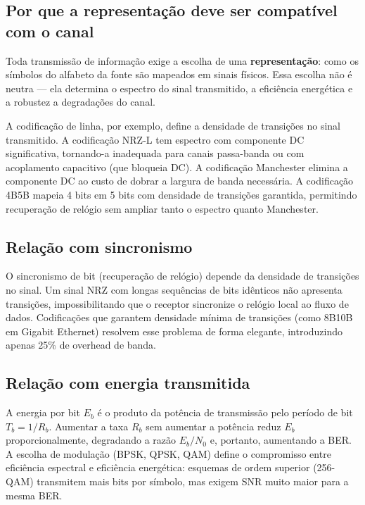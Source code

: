 \documentclass[conference]{IEEEtran}
\begin{document}
\subsection*{Por que a representação deve ser compatível com o canal}

Toda transmissão de informação exige a escolha de uma \textbf{representação}: como os
símbolos do alfabeto da fonte são mapeados em sinais físicos. Essa escolha não é neutra ---
ela determina o espectro do sinal transmitido, a eficiência energética e a robustez a
degradações do canal.

A codificação de linha, por exemplo, define a densidade de transições no sinal transmitido.
A codificação NRZ-L tem espectro com componente DC significativa, tornando-a inadequada
para canais passa-banda ou com acoplamento capacitivo (que bloqueia DC). A codificação
Manchester elimina a componente DC ao custo de dobrar a largura de banda necessária.
A codificação 4B5B mapeia 4 bits em 5 bits com densidade de transições garantida,
permitindo recuperação de relógio sem ampliar tanto o espectro quanto Manchester.

\subsection*{Relação com sincronismo}

O sincronismo de bit (recuperação de relógio) depende da densidade de transições no sinal.
Um sinal NRZ com longas sequências de bits idênticos não apresenta transições, impossibilitando
que o receptor sincronize o relógio local ao fluxo de dados. Codificações que garantem
densidade mínima de transições (como 8B10B em Gigabit Ethernet) resolvem esse problema
de forma elegante, introduzindo apenas 25\% de overhead de banda.

\subsection*{Relação com energia transmitida}

A energia por bit $E_b$ é o produto da potência de transmissão pelo período de bit $T_b = 1/R_b$.
Aumentar a taxa $R_b$ sem aumentar a potência reduz $E_b$ proporcionalmente, degradando a
razão $E_b/N_0$ e, portanto, aumentando a BER. A escolha de modulação (BPSK, QPSK, QAM)
define o compromisso entre eficiência espectral e eficiência energética: esquemas de ordem
superior (256-QAM) transmitem mais bits por símbolo, mas exigem SNR muito maior para a
mesma BER.
\end{document}
